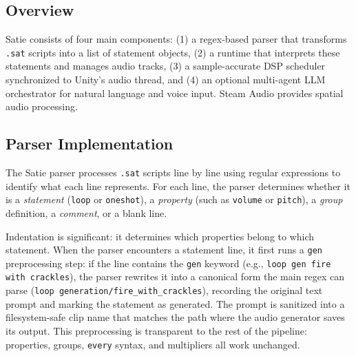 \documentclass[sigconf,anonymous,review]{nimeart}
\begin{document}

\subsection{Overview}

Satie consists of four main components: (1) a regex-based parser that transforms \texttt{.sat} scripts into a list of statement objects, (2) a runtime that interprets these statements and manages audio tracks, (3) a sample-accurate DSP scheduler synchronized to Unity's audio thread, and (4) an optional multi-agent LLM orchestrator for natural language and voice input. Steam Audio provides spatial audio processing.

\subsection{Parser Implementation}

The Satie parser processes \texttt{.sat} scripts line by line using regular expressions to identify what each line represents. For each line, the parser determines whether it is a \textit{statement} (\texttt{loop} or \texttt{oneshot}), a \textit{property} (such as \texttt{volume} or \texttt{pitch}), a \textit{group} definition, a \textit{comment}, or a blank line.

Indentation is significant: it determines which properties belong to which statement. When the parser encounters a statement line, it first runs a \texttt{gen} preprocessing step: if the line contains the \texttt{gen} keyword (e.g., \texttt{loop gen fire with crackles}), the parser rewrites it into a canonical form the main regex can parse (\texttt{loop generation/fire\_with\_crackles}), recording the original text prompt and marking the statement as generated. The prompt is sanitized into a filesystem-safe clip name that matches the path where the audio generator saves its output. This preprocessing is transparent to the rest of the pipeline: properties, groups, \texttt{every} syntax, and multipliers all work unchanged.
\end{document}
